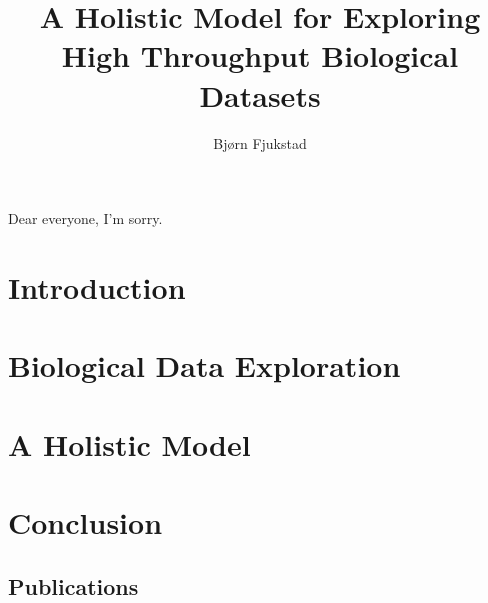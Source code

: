 \documentclass[USenglish,phd]{uit-thesis}
\begin{document}
 

\title{A Holistic Model for Exploring High Throughput Biological Datasets}
\author{Bjørn Fjukstad}
\maketitle

\begin{dedication}
    Dear everyone, I'm sorry.
\end{dedication}

\frontmatter
 
 

\tableofcontents
\mainmatter

\chapter{Introduction}
 

\chapter{Biological Data Exploration}


\chapter{A Holistic Model} 


\chapter{Conclusion}
 

\appendix
\begin{appendix}
    \chapter{Publications}
\end{appendix}
\end{document}
